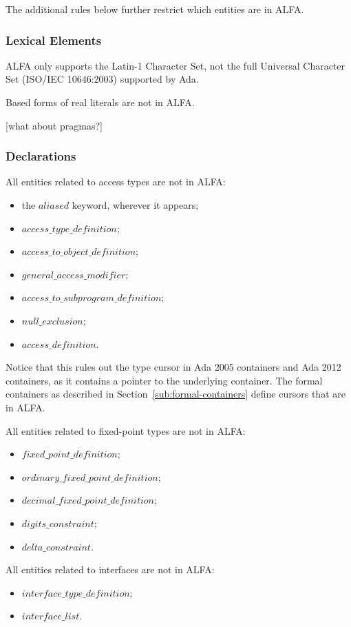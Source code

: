 \documentclass{article}
\newcommand{\bnf}[1]{$\mathit{#1}$}
\begin{document}
The additional rules below further restrict which entities are in ALFA. 

\subsubsection{Lexical Elements}

ALFA only supports the Latin-1 Character Set, not the full Universal Character
Set (ISO/IEC 10646:2003) supported by Ada.

Based forms of real literals are not in ALFA.

[what about pragmas?]

\subsubsection{Declarations}

All entities related to access types are not in ALFA:
\begin{itemize}
\item the \bnf{aliased} keyword, wherever it appears;
\item \bnf{access\_type\_definition};
\item \bnf{access\_to\_object\_definition};
\item \bnf{general\_access\_modifier};
\item \bnf{access\_to\_subprogram\_definition};
\item \bnf{null\_exclusion};
\item \bnf{access\_definition}.
\end{itemize}

Notice that this rules out the type cursor in Ada 2005 containers and Ada 2012
containers, as it contains a pointer to the underlying container. The formal
containers as described in Section~\ref{sub:formal-containers} define cursors
that are in ALFA.

All entities related to fixed-point types are not in ALFA:
\begin{itemize}
\item \bnf{fixed\_point\_definition};
\item \bnf{ordinary\_fixed\_point\_definition};
\item \bnf{decimal\_fixed\_point\_definition};
\item \bnf{digits\_constraint};
\item \bnf{delta\_constraint}.
\end{itemize}

All entities related to interfaces are not in ALFA:
\begin{itemize}
\item \bnf{interface\_type\_definition};
\item \bnf{interface\_list}.
\end{itemize}
\end{document}
